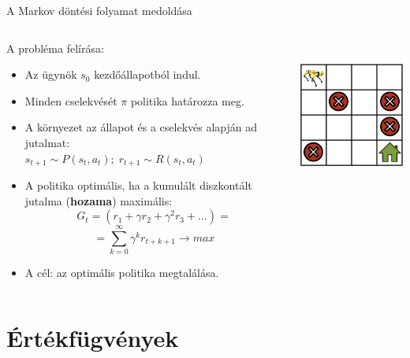 \documentclass[english, aspectratio=169]{beamer}
\makeatletter
\let\origtableofcontents=\tableofcontents
\def\tableofcontents{\@ifnextchar[{\origtableofcontents}{\gobbletableofcontents}}
\def\gobbletableofcontents#1{\origtableofcontents}
\makeatother
\begin{document}
\begin{frame}{A Markov döntési folyamat medoldása}
\begin{columns}
\begin{column}{.6\textwidth}
A probléma felírása: 
\begin{itemize}
	\item Az ügynök $s_0$ kezdőállapotból indul.
	\item Minden cselekvését $\pi$ politika határozza meg.
	\item A környezet az állapot és a cselekvés alapján ad jutalmat:\\
	$s_{t+1}\sim{P(s_{t}, a_{t})};\;r_{t+1}\sim{R(s_{t}, a_{t})}$
	\item A politika optimális, ha a kumulált diszkontált jutalma (\textbf{hozama}) maximális:\\
	\[	
	G_{t} = (r_{1} + \gamma r_{2} + \gamma ^2 r_{3} + ...)=
	\]
	\[	
	=\sum_{k=0}^{\infty}\gamma^{k}r_{t+k+1} \rightarrow max
	\]
	\item A cél: az optimális politika megtalálása.
\end{itemize}
\end{column}
\begin{column}{.4\textwidth}
\begin{center}
\includegraphics[width=5cm, height=5cm, keepaspectratio]{images/reinf_8.png}
\end{center}
\end{column}
\end{columns}
\end{frame}

\section{Értékfügvények}

\begin{frame}
\tableofcontents[currentsection]
\end{frame}
\end{document}
